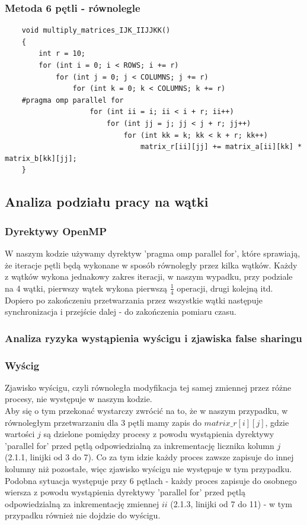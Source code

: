 \documentclass[10pt,a4paper]{article}
\begin{document}
\subsubsection{Metoda 6 pętli - równolegle}
\begin{lstlisting}
    void multiply_matrices_IJK_IIJJKK()
    {
        int r = 10;
        for (int i = 0; i < ROWS; i += r)
            for (int j = 0; j < COLUMNS; j += r)
                for (int k = 0; k < COLUMNS; k += r)
    #pragma omp parallel for
                    for (int ii = i; ii < i + r; ii++)
                        for (int jj = j; jj < j + r; jj++)
                            for (int kk = k; kk < k + r; kk++)
                                matrix_r[ii][jj] += matrix_a[ii][kk] * matrix_b[kk][jj];
    }
\end{lstlisting}
\newpage

\subsection{Analiza podziału pracy na wątki}
\subsubsection{Dyrektywy OpenMP}
W naszym kodzie używamy dyrektyw 'pragma omp parallel for', które sprawiają, że iteracje pętli
będą wykonane w sposób równoległy przez kilka wątków. Każdy z wątków wykona jednakowy zakres
iteracji, w naszym wypadku, przy podziale na 4 wątki, pierwszy wątek wykona pierwszą $\frac{1}{4}$
operacji, drugi kolejną itd. Dopiero po zakończeniu przetwarzania przez wszystkie wątki następuje
synchronizacja i przejście dalej - do zakończenia pomiaru czasu.

\subsubsection{Analiza ryzyka wystąpienia wyścigu i zjawiska false sharingu}

\subsubsection*{Wyścig}

Zjawisko wyścigu, czyli równoległa modyfikacja tej samej zmiennej przez różne procesy, nie
występuje w naszym kodzie.\\
Aby się o tym przekonać wystarczy zwrócić na to, że w naszym przypadku,
w równoległym przetwarzaniu dla 3 pętli mamy zapis do $matrix\_r[i][j]$, gdzie wartości $j$ są
dzielone pomiędzy procesy z powodu wystąpienia dyrektywy 'parallel for' przed pętlą odpowiedzialną
za inkrementację licznika kolumn $j$ (2.1.1, linijki od 3 do 7). Co za tym idzie każdy proces zawsze zapisuje do innej kolumny
niż pozostałe, więc zjawisko wyścigu nie występuje w tym przypadku.\\
Podobna sytuacja występuje przy 6 pętlach - każdy proces zapisuje do osobnego wiersza z powodu
wystąpienia dyrektywy 'parallel for' przed pętlą odpowiedzialną za inkrementację zmiennej $ii$
(2.1.3, linijki od 7 do 11) - w tym przypadku również nie dojdzie do wyścigu.
\end{document}
